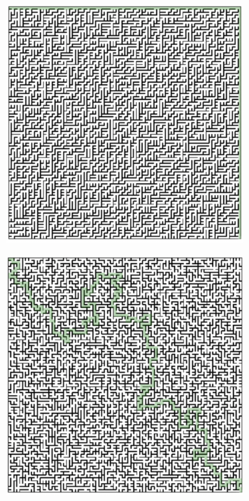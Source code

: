 \begin{figure}[!h]
	\centering
	\begin{subfigure}{.30\textwidth}
	  \centering
	  \includegraphics[width=1\linewidth]{perfectBinary.png}
	  \caption{}
	  \label{fig:sub1}
	\end{subfigure}
	\begin{subfigure}{.30\textwidth}
	  \centering
	  \includegraphics[width=1\linewidth]{perfectAldous.png}

\end{subfigure}
\end{figure}
